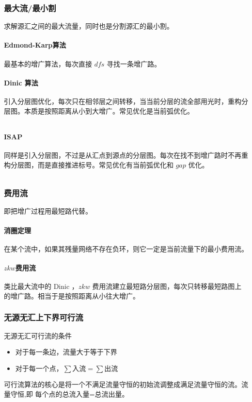 \documentclass[UTF-8]{ctexart}
\newcommand{\cpp}[1]{\inputminted[bgcolor=bg,breaklines,breakanywhere=true]{c++}{#1}}
\begin{document}
			\subsubsection{最大流/最小割}
			求解源汇之间的最大流量，同时也是分割源汇的最小割。
			\paragraph{Edmond-Karp算法} 最基本的增广算法，每次直接 $dfs$ 寻找一条增广路。
			\paragraph{Dinic 算法} 引入分层图优化，每次只在相邻层之间转移，当当前分层的流全部用光时，重构分层图。本质是按照距离从小到大增广。常见优化是当前弧优化。
			\cpp{code//Graph//dinic.cpp}
			\paragraph{ISAP} 同样是引入分层图，不过是从汇点到源点的分层图。每次在找不到增广路时不再重构分层图，而是直接推进标号。常见优化有当前弧优化和 $gap$ 优化。
			\cpp{code//Graph//isap.cpp}
			\subsubsection{费用流}
			即把增广过程用最短路代替。
			\paragraph{消圈定理} 在某个流中，如果其残量网络不存在负环，则它一定是当前流量下的最小费用流。
			\paragraph{$zkw$费用流} 类比最大流中的 Dinic ，$zkw$ 费用流建立最短路分层图，每次只转移最短路图上的增广路。相当于是按照距离从小往大增广。
			\subsubsection{无源无汇上下界可行流}
			无源无汇可行流的条件 
			\begin{itemize}
				\item 对于每一条边，流量大于等于下界  
				\item 对于每一个点，$\sum \mbox{入流}=\sum \mbox{出流}$
			\end{itemize} 
			
			可行流算法的核心是将一个不满足流量守恒的初始流调整成满足流量守恒的流。流量守恒,即 每个点的总流入量=总流出量。
			
\end{document}
